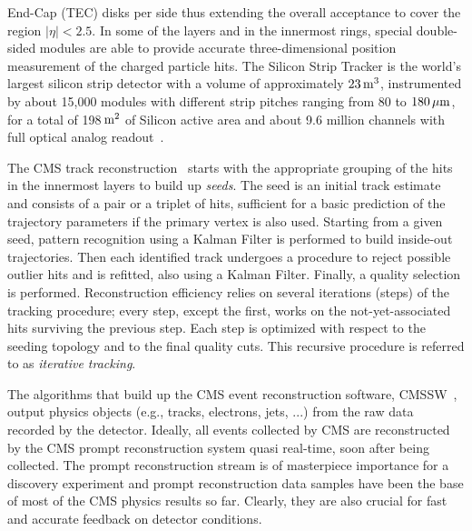 End-Cap (TEC) disks per side
thus extending the overall acceptance to cover the region
$|\eta|<2.5$. In some of the layers and in the innermost 
rings, special double-sided modules
are able to provide accurate three-dimensional position measurement of the charged
particle hits.  The Silicon Strip Tracker is the world's largest silicon
strip detector with a volume of approximately $23\rm \, m^3$, instrumented by about 15,000 modules
with different strip pitches ranging from 80 to $180\, \mu \rm m$, for a total
of 198$\rm \, m^2$ of Silicon active area and about 9.6 million channels with full optical analog readout~\cite{cms}\cite{TkTDR}\cite{TkTDRadd}.



The CMS track reconstruction~\cite{trackreco} starts with the appropriate grouping of the hits
in the innermost layers to build up {\em seeds}. The seed is an initial track
estimate and consists of a pair or a triplet of hits, sufficient for a
basic prediction of the trajectory parameters if the primary vertex is
 also used. Starting from a given seed, pattern recognition using a Kalman Filter
is performed to build inside-out trajectories. Then each identified
track undergoes a procedure to reject possible outlier hits and is
refitted, also using a Kalman Filter. Finally, a quality selection is
performed. Reconstruction efficiency relies on several iterations (steps) of the
tracking procedure; every step, except the first, works on the
not-yet-associated hits surviving the previous step. Each step is
optimized with respect to the seeding topology and to the final
quality cuts. This recursive procedure is referred to as {\em
  iterative tracking}.

The algorithms that build up the CMS event reconstruction software, CMSSW~\cite{cmssw},
output physics objects (e.g., tracks, electrons, jets, ...) from the
raw data recorded by the detector. Ideally, all events collected by CMS are
reconstructed by the CMS prompt reconstruction system quasi real-time, soon after being
collected. The prompt reconstruction stream is of masterpiece
importance for a discovery experiment and prompt reconstruction data
samples have been the base of most of the CMS physics results so
far. Clearly, they are also crucial for fast and accurate feedback on detector
conditions.

